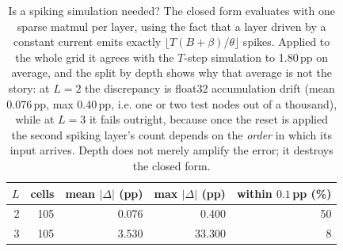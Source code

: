 \begin{table}[t]
\centering
\footnotesize
\caption{Is a spiking simulation needed? The closed form evaluates  with one sparse matmul per layer, using the fact that a layer driven by a constant current emits exactly $\lfloor T(B+\beta)/\theta\rfloor$ spikes. Applied to the whole grid it agrees with the $T$-step simulation to 1.80\,pp on average, and the split by depth shows why that average is not the story: at $L=2$ the discrepancy is float32 accumulation drift (mean 0.076\,pp, max 0.40\,pp, i.e. one or two test nodes out of a thousand), while at $L=3$ it fails outright, because once the reset is applied the second spiking layer's count depends on the \emph{order} in which its input arrives. Depth does not merely amplify the error; it destroys the closed form.}
\label{tab:closed}
\begin{tabular}{rrrrr}
\toprule
$L$ & cells & mean $|\Delta|$ (pp) & max $|\Delta|$ (pp) & within $0.1$\,pp (\%) \\
\midrule
2 & 105 & 0.076 & 0.400 & 50 \\
3 & 105 & 3.530 & 33.300 & 8 \\
\bottomrule
\end{tabular}
\end{table}
